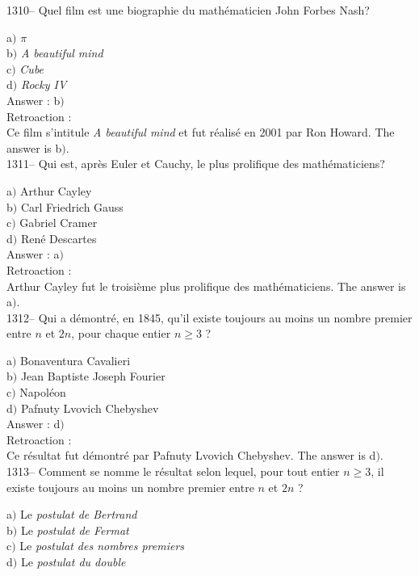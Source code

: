 ﻿\documentclass[letterpaper, 12pt]{article}
\begin{document}
1310-- Quel film est une biographie du math\'ematicien John Forbes
Nash?

a$)$ {\sl $\pi$} \\
b$)$ {\sl A beautiful mind} \\
c$)$ {\sl Cube}  \\
d$)$ {\sl Rocky IV}\\

Answer : b$)$\\

Retroaction : \\
Ce film s'intitule {\sl A beautiful mind} et fut r\'ealis\'e en 2001
par Ron Howard.
The answer is  b$)$.\\

1311-- Qui est, apr\`es Euler et Cauchy, le plus prolifique des
math\'ematiciens?

a$)$ Arthur Cayley \\
b$)$ Carl Friedrich Gauss \\
c$)$ Gabriel Cramer  \\
d$)$ Ren\'e Descartes\\

Answer : a$)$\\

Retroaction : \\
Arthur Cayley fut le troisi\`eme plus prolifique des
math\'ematiciens.
The answer is  a$)$.\\

1312-- Qui a d\'emontr\'e, en 1845, qu'il existe toujours au moins un nombre
premier entre $n$ et $2n$, pour
chaque entier $n\ge3$ ?

a$)$ Bonaventura Cavalieri \\
b$)$ Jean Baptiste Joseph Fourier \\
c$)$ Napol\'eon  \\
d$)$ Pafnuty Lvovich Chebyshev\\

Answer : d$)$\\

Retroaction : \\
Ce r\'esultat fut d\'emontr\'e par Pafnuty Lvovich Chebyshev.
The answer is  d$)$.\\

1313-- Comment se nomme le r\'esultat selon lequel, pour tout entier
$n\ge3$, il existe toujours au moins un nombre premier entre $n$ et $2n$ ?

a$)$ Le {\sl postulat de Bertrand} \\
b$)$ Le {\sl postulat de Fermat} \\
c$)$ Le {\sl postulat des nombres premiers}  \\
d$)$ Le {\sl postulat du double}\\
\end{document}
